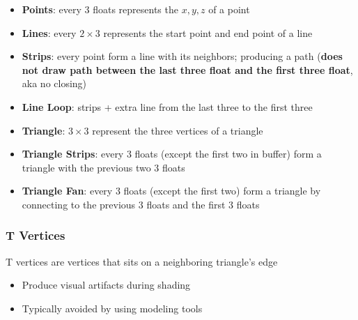   \begin{itemize}
    \item \textbf{Points}: every $ 3 $ floats represents the $ x, y, z $ of
    a point
    \item \textbf{Lines}: every $ 2 \times 3 $ represents the start point
    and end point of a line
    \item \textbf{Strips}: every point form a line with its neighbors;
    producing a path (\textbf{does not draw path between the last three float
    and the first three float}, aka no closing)
    \item \textbf{Line Loop}: strips + extra line from the last three to the
    first three
    \item \textbf{Triangle}: $ 3 \times 3 $ represent the three vertices of a
    triangle
    \item \textbf{Triangle Strips}: every $ 3 $ floats (except the first two in
    buffer) form a triangle with the previous two $ 3 $ floats
    \item \textbf{Triangle Fan}: every $ 3 $ floats (except the first two)
    form a triangle by connecting to the previous $ 3 $ floats and the first
    $ 3 $ floats
  \end{itemize}

  \subsubsection{T Vertices}

    T vertices are vertices that sits on a neighboring triangle's edge

    \begin{itemize}
      \item Produce visual artifacts during shading
      \item Typically avoided by using modeling tools
    \end{itemize}
